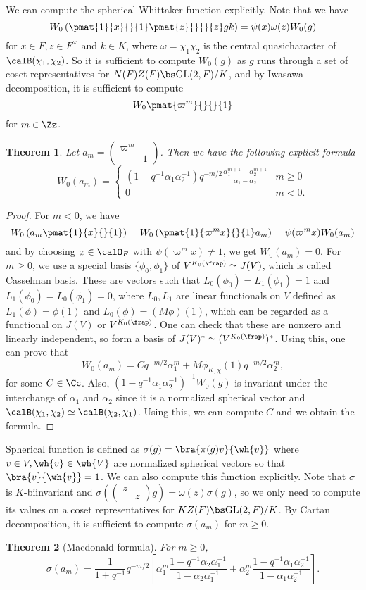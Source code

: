 \documentclass{article}
\newtheorem{theorem}{Theorem}[section]
\newcommand{\GL}{\mathrm{GL}}
\newcommand{\smat}[4]{\left(\begin{smallmatrix} #1 & #2 \\ #3 & #4 \end{smallmatrix}\right)}
\begin{document}
We can compute the spherical Whittaker function explicitly. 
Note that we have
$$
W_{0}\left( \pmat{1}{x}{}{1} \pmat{z}{}{}{z} gk\right) = \psi(x)\omega(z)W_{0}(g)
$$
for $x\in F, z\in F^{\times}$ and $k\in K$, where $\omega = \chi_1 \chi_2$ is the central quasicharacter of $\calB(\chi_1, \chi_2)$. 
So it is sufficient to compute $W_{0}(g)$ as $g$ runs through a set of coset representatives for $N(F)Z(F)\bs \GL(2, F)/ K$, and by Iwasawa decomposition, it is sufficient to compute 
$$
W_{0}\pmat{\varpi^m}{}{}{1}
$$
for $m\in \Zz$. 
\begin{theorem}
\label{explicitsph}
Let $a_{m} = \smat{\varpi^m}{}{}{1}$. Then we have the following explicit formula
$$
W_{0}(a_m) = \begin{cases} (1-q^{-1}\alpha_1 \alpha_2^{-1}) q^{-m/2} \frac{\alpha_{1}^{m+1} -\alpha_{2}^{m+1}}{\alpha_{1} - \alpha_{2}} & m \geq 0 \\ 0 & m < 0. \end{cases}
$$
\end{theorem}
\begin{proof}
For $m<0$, we have
$$
W_{0}\left( a_m \pmat{1}{x}{}{1} \right) = W_{0}\left( \pmat{1}{\varpi^{m}x}{}{1}a_m \right) = \psi(\varpi^{m}x)W_{0}(a_{m})
$$
and by choosing $x\in \calO_F$ with $\psi(\varpi^{m}x)\neq 1$, we get $W_{0}(a_{m}) = 0$. 
For $m\geq 0$, we use a special basis $\{\phi_0, \phi_1\}$ of $V^{K_{0}(\frap)} \simeq J(V)$, which is called Casselman basis. These are vectors such that $L_{0}(\phi_{0}) = L_{1}(\phi_{1}) = 1$ and $L_{1}(\phi_{0}) = L_{0}(\phi_{1}) = 0$, where $L_{0}, L_{1}$ are linear functionals on $V$ defined as $L_{1}(\phi) = \phi(1)$ and $L_{0}(\phi) = (M\phi)(1)$, which can be regarded as a functional on $J(V)$ or $V^{K_{0}(\frap)}$. One can check that these are nonzero and linearly independent, so form a basis of $J(V)^{*} \simeq (V^{K_{0}(\frap)})^{*}$. 
Using this, one can prove that
$$
W_{0}(a_{m}) = C q^{-m/2}\alpha_{1}^{m} + M\phi_{K, \chi}(1)  q^{-m/2}\alpha_2^m,
$$
for some $C\in \Cc$. Also, $(1-q^{-1}\alpha_{1}\alpha_{2}^{-1})^{-1}W_{0}(g)$ is invariant under the interchange of $\alpha_1$ and $\alpha_2$ since it is a normalized spherical vector and $\calB(\chi_1, \chi_2)\simeq \calB(\chi_2, \chi_1)$. 
Using this, we can compute $C$ and we obtain the formula. 
\end{proof}
Spherical function is defined as $\sigma(g) = \bra{\pi(g)v}{\wh{v}}$ where $v\in V, \wh{v}\in \wh{V}$ are normalized spherical vectors so that $\bra{v}{\wh{v}} = 1$. 
We can also compute this function explicitly. 
Note that $\sigma$ is $K$-biinvariant and $\sigma(\smat{z}{}{}{z}g) = \omega(z)\sigma(g)$, so we only need to compute its values on a coset representatives for $KZ(F) \bs \GL(2, F) / K$. 
By Cartan decomposition, it is sufficient to compute $\sigma(a_{m})$ for $m\geq 0$. 
\begin{theorem}[Macdonald formula] For $m\geq 0$, 
$$
\sigma(a_m) = \frac{1}{1+q^{-1}} q^{-m/2} \left[ \alpha_1^m \frac{1 - q^{-1}\alpha_{2}\alpha_{1}^{-1}}{1-\alpha_{2}\alpha_{1}^{-1}} + \alpha_{2}^{m} \frac{1-q^{-1}\alpha_{1}\alpha_{2}^{-1}}{1-\alpha_{1}\alpha_{2}^{-1}}\right].
$$
\end{theorem}
\end{document}
